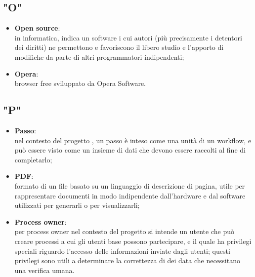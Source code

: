 \subsection*{"O"}
\begin{itemize}
\item \textbf{Open source}:\\ in informatica, indica un software i cui autori (più precisamente i detentori dei diritti) ne permettono e favoriscono il libero studio e l'apporto di modifiche da parte di altri programmatori indipendenti;
\item \textbf{Opera}:\\ browser free sviluppato da Opera Software.
\end{itemize}

\subsection*{"P"}
\begin{itemize}
\item \textbf{Passo}:\\ nel contesto del progetto \progetto{}, un passo è inteso come una unità di un workflow, e può essere visto come un insieme di dati che devono essere raccolti al fine di completarlo;
\item \textbf{PDF}:\\ formato di un file basato su un linguaggio di descrizione di pagina, utile per rappresentare documenti in modo indipendente dall'hardware e dal software utilizzati per generarli o per visualizzarli;
\item \textbf{Process owner}:\\ per process owner nel contesto del progetto si intende un utente che può creare processi a cui gli utenti base possono partecipare, e il quale ha privilegi speciali riguardo l'accesso delle informazioni inviate dagli utenti; questi privilegi sono utili a determinare la correttezza di dei data che necessitano una verifica umana.
\end{itemize}

